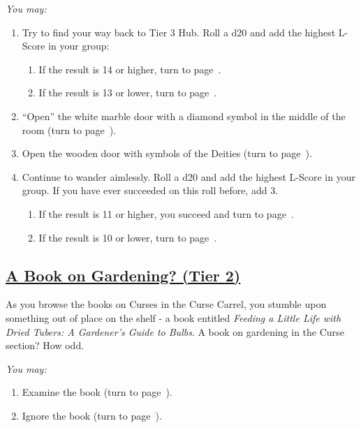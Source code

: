\documentclass[sheet]{GL2020}
\begin{document}
\begingroup
\itshape
You may:
\begin{enumerate}[A]
  \item Try to find your way back to Tier 3 Hub. Roll a d20 and add the highest L-Score in your group:
	\begin{enumerate}
		\item If the result is 14 or higher, turn to page~\pageref{TierThreeHub}.
		\item If the result is 13 or lower, turn to page~\pageref{LostintheStacks}.
	\end{enumerate}
	\item ``Open'' the white marble door with a diamond symbol in the middle of the room (turn to page~\pageref{WaxMuseum}).
	\item Open the wooden door with symbols of the Deities (turn to page~\pageref{HallofHeadlessGuardians}).
	\item Continue to wander aimlessly. Roll a d20 and add the highest L-Score in your group. If you have ever succeeded on this roll before, add 3.
	\begin{enumerate}
		\item If the result is 11 or higher, you succeed and turn to page~\pageref{StrangeEpigraph}.
		\item If the result is 10 or lower, turn to page~\pageref{LostintheStacks}.
	\end{enumerate}
\end{enumerate}
\endgroup

\clearpage

\begin{center}\section*{\underline{A Book on Gardening? (Tier 2)}}\end{center}
\label{BookonGardening}

As you browse the books on Curses in the Curse Carrel, you stumble upon something out of place on the shelf - a book entitled \emph{Feeding a Little Life with Dried Tubers: A Gardener’s Guide to Bulbs}. A book on gardening in the Curse section? How odd. 

\vspace{0.5cm}

\begingroup
\itshape
You may:
\begin{enumerate}[A]
  \item Examine the book (turn to page~\pageref{FloralPortal}).
	\item Ignore the book (turn to page~\pageref{CurseCarrel}).
\end{enumerate}
\endgroup
\end{document}
